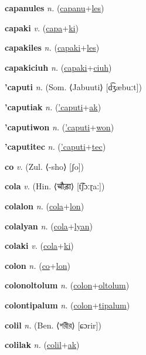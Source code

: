 \textbf{\hypertarget{capanules}{capanules}} \textit{n.} (\hyperlink{capanu}{capanu}+\allowbreak \hyperlink{les}{les})


\textbf{\hypertarget{capaki}{capaki}} \textit{v.} (\hyperlink{capa}{capa}+\allowbreak \hyperlink{ki}{ki})


\textbf{\hypertarget{capakiles}{capakiles}} \textit{n.} (\hyperlink{capaki}{capaki}+\allowbreak \hyperlink{les}{les})


\textbf{\hypertarget{capakiciuh}{capakiciuh}} \textit{n.} (\hyperlink{capaki}{capaki}+\allowbreak \hyperlink{ciuh}{ciuh})


\textbf{\hypertarget{'caputi}{'caputi}} \textit{n.} (Som. ⟨Jabuuti⟩ [d͡ʒæbuːt])


\textbf{\hypertarget{'caputiak}{'caputiak}} \textit{n.} (\hyperlink{'caputi}{'caputi}+\allowbreak \hyperlink{ak}{ak})


\textbf{\hypertarget{'caputiwon}{'caputiwon}} \textit{n.} (\hyperlink{'caputi}{'caputi}+\allowbreak \hyperlink{won}{won})


\textbf{\hypertarget{'caputitec}{'caputitec}} \textit{n.} (\hyperlink{'caputi}{'caputi}+\allowbreak \hyperlink{tec}{tec})


\textbf{\hypertarget{co}{co}} \textit{v.} (Zul. ⟨-sho⟩ [ʃo])


\textbf{\hypertarget{cola}{cola}} \textit{v.} (Hin. ⟨{\devanagari{}चौड़ा}⟩ [t͡ʃɔːɽaː])


\textbf{\hypertarget{colalon}{colalon}} \textit{n.} (\hyperlink{cola}{cola}+\allowbreak \hyperlink{lon}{lon})


\textbf{\hypertarget{colalyan}{colalyan}} \textit{n.} (\hyperlink{cola}{cola}+\allowbreak \hyperlink{lyan}{lyan})


\textbf{\hypertarget{colaki}{colaki}} \textit{v.} (\hyperlink{cola}{cola}+\allowbreak \hyperlink{ki}{ki})


\textbf{\hypertarget{colon}{colon}} \textit{n.} (\hyperlink{co}{co}+\allowbreak \hyperlink{lon}{lon})


\textbf{\hypertarget{colonoltolum}{colonoltolum}} \textit{n.} (\hyperlink{colon}{colon}+\allowbreak \hyperlink{oltolum}{oltolum})


\textbf{\hypertarget{colontipalum}{colontipalum}} \textit{n.} (\hyperlink{colon}{colon}+\allowbreak \hyperlink{tipalum}{tipalum})


\textbf{\hypertarget{colil}{colil}} \textit{n.} (Ben. ⟨{\bengali{}শরীর}⟩ [ɕɔrir])


\textbf{\hypertarget{colilak}{colilak}} \textit{n.} (\hyperlink{colil}{colil}+\allowbreak \hyperlink{ak}{ak})



